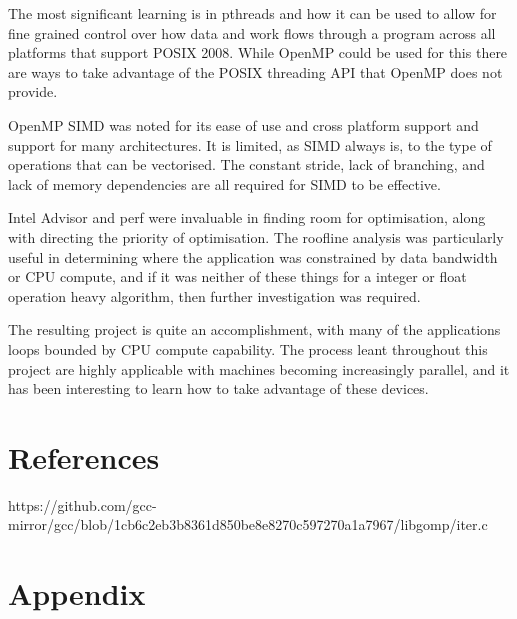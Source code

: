 \documentclass{article}
\begin{document}
The most significant learning is in pthreads and how it can be used to allow for fine grained control over 
how data and work flows through a program across all platforms that support POSIX 2008. While OpenMP could 
be used for this there are ways to take advantage of the POSIX threading API that OpenMP does not provide.

OpenMP SIMD was noted for its ease of use and cross platform support and support for many architectures.
It is limited, as SIMD always is, to the type of operations that can be vectorised. The constant stride, 
lack of branching, and lack of memory dependencies are all required for SIMD to be effective.

Intel Advisor and perf were invaluable in finding room for optimisation, along with directing the priority
of optimisation. The roofline analysis was particularly useful in determining where the application was
constrained by data bandwidth or CPU compute, and if it was neither of these things for a integer or float 
operation heavy algorithm, then further investigation was required. 

The resulting project is quite an accomplishment, with many of the applications loops bounded by CPU compute
capability. The process leant throughout this project are highly applicable with machines becoming 
increasingly parallel, and it has been interesting to learn how to take advantage of these devices.

\section{References}
https://github.com/gcc-mirror/gcc/blob/1cb6c2eb3b8361d850be8e8270c597270a1a7967/libgomp/iter.c

\appendix
\section{Appendix}
\end{document}
